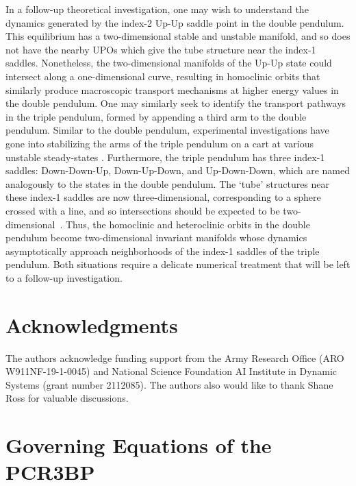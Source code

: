 \documentclass[11pt]{article}
\numberwithin{equation}{section}
\theoremstyle{plain}
\begin{document}
In a follow-up theoretical investigation, one may wish to understand the dynamics generated by the index-2 Up-Up saddle point in the double pendulum. This equilibrium has a two-dimensional stable and unstable manifold, and so does not have the nearby UPOs which give the tube structure near the index-1 saddles. Nonetheless, the two-dimensional manifolds of the Up-Up state could intersect along a one-dimensional curve, resulting in homoclinic orbits that similarly produce macroscopic transport mechanisms at higher energy values in the double pendulum. One may similarly seek to identify the transport pathways in the triple pendulum, formed by appending a third arm to the double pendulum. Similar to the double pendulum, experimental investigations have gone into stabilizing the arms of the triple pendulum on a cart at various unstable steady-states \cite{gluck2013swing,yaren2018stabilization,graichen2005fast,medrano1997robust}. Furthermore, the triple pendulum has three index-1 saddles: Down-Down-Up, Down-Up-Down, and Up-Down-Down, which are named analogously to the states in the double pendulum. The `tube' structures near these index-1 saddles are now three-dimensional, corresponding to a sphere crossed with a line, and so intersections should be expected to be two-dimensional~\cite{Chemical2}. Thus, the homoclinic and heteroclinic orbits in the double pendulum become two-dimensional invariant manifolds whose dynamics asymptotically approach neighborhoods of the index-1 saddles of the triple pendulum. Both situations require a delicate numerical treatment that will be left to a follow-up investigation.   






\section*{Acknowledgments} 
The authors acknowledge funding support from the Army Research Office (ARO W911NF-19-1-0045) and National Science Foundation AI Institute in Dynamic Systems (grant number 2112085). 
The authors also would like to thank Shane Ross for valuable discussions.


\appendix

\section{Governing Equations of the PCR3BP}
\end{document}
